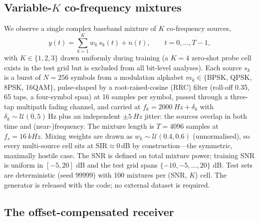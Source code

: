 \documentclass[review,12pt]{elsarticle}
\newcommand{\sir}{\mathrm{SIR}}
\begin{document}
\subsection{Variable-$K$ co-frequency mixtures}
\label{sec:setup}

We observe a single complex baseband mixture of $K$ co-frequency
sources,
\begin{equation}
  y(t) = \sum_{k=1}^{K} w_k\, s_k(t) + n(t), \qquad t = 0,\dots,T{-}1,
  \label{eq:mix}
\end{equation}
with $K \in \{1,2,3\}$ drawn uniformly during training (a $K{=}4$
zero-shot probe cell exists in the test grid but is excluded from all
bit-level analyses). Each source $s_k$ is a burst of $N = 256$ symbols
from a modulation alphabet
$m_k \in \{$BPSK, QPSK, 8PSK, 16QAM$\}$, pulse-shaped by a
root-raised-cosine (RRC) filter (roll-off 0.35, 65 taps, a four-symbol
span) at 16 samples
per symbol, passed through a three-tap multipath fading channel, and
carried at $f_k = \SI{2000}{Hz} + \delta_k$ with
$\delta_k \sim \mathcal{U}(0, 5)$\,Hz plus an independent
$\pm \SI{5}{Hz}$ jitter: the sources overlap in both time and
(near-)frequency. The mixture length is $T = 4096$ samples at
$f_s = \SI{16}{kHz}$. Mixing weights are drawn as
$w_k \sim \mathcal{U}(0.4, 0.6)$ (unnormalised), so every multi-source
cell sits at $\sir \approx 0$\,dB by construction---the symmetric,
maximally hostile case. The SNR is defined on total mixture power;
training SNR is uniform in $[-5, 20]$ dB and the test grid spans
$\{-10, -5, \dots, 20\}$ dB. Test sets are deterministic (seed 99999)
with 100 mixtures per (SNR, $K$) cell. The generator is released with
the code; no external dataset is required.

\subsection{The offset-compensated receiver}
\label{sec:rx}
\end{document}
